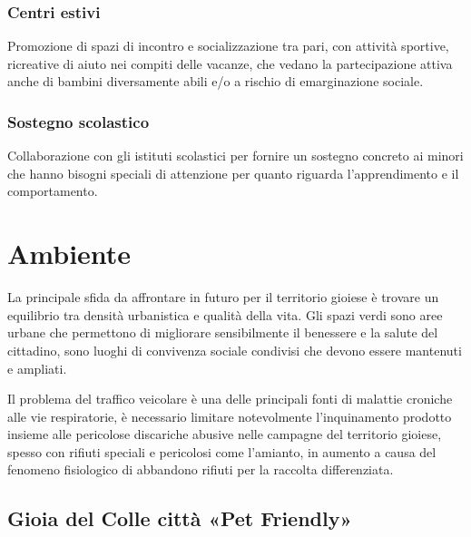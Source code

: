 \documentclass[a4paper,14pt,italian]{sphinxmanual}
\begin{document}
\subsection{Centri estivi}
\label{\detokenize{salute:centri-estivi}}
Promozione di spazi di incontro e socializzazione tra pari, con attività sportive, ricreative di aiuto nei compiti delle vacanze, che vedano la partecipazione attiva anche di bambini diversamente abili e/o a rischio di emarginazione sociale.


\subsection{Sostegno scolastico}
\label{\detokenize{salute:sostegno-scolastico}}
Collaborazione con gli istituti scolastici per fornire un sostegno concreto ai minori che hanno bisogni speciali di attenzione per quanto riguarda l’apprendimento e il comportamento.


\chapter{Ambiente}
\label{\detokenize{ambiente:ambiente}}\label{\detokenize{ambiente::doc}}


La principale sfida da affrontare in futuro per il territorio gioiese è trovare un equilibrio tra densità urbanistica e qualità della vita.
Gli spazi verdi sono aree urbane che permettono di migliorare sensibilmente il benessere e la salute del cittadino, sono luoghi di convivenza sociale condivisi che devono essere mantenuti e ampliati.

Il problema del traffico veicolare è una delle principali fonti di malattie croniche alle vie respiratorie, è necessario limitare notevolmente l’inquinamento prodotto insieme alle pericolose discariche abusive nelle campagne del territorio gioiese, spesso con rifiuti speciali e pericolosi come l’amianto, in aumento a causa del fenomeno fisiologico di abbandono rifiuti per la raccolta differenziata.


\section{Gioia del Colle città «Pet Friendly»}
\label{\detokenize{ambiente:gioia-del-colle-citta-pet-friendly}}
\end{document}
